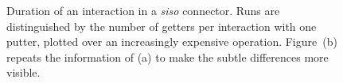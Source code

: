 \begin{figure}
	\centering
	\caption[Duration of interaction in siso connector with clonable data.]{Duration of an interaction in a \textit{siso} connector. Runs are distinguished by the number of getters per interaction with one putter, plotted over an increasingly expensive  operation. Figure~(b) repeats the information of (a) to make the subtle differences more visible.}
	\label{fig:clone_compete}
\end{figure}


